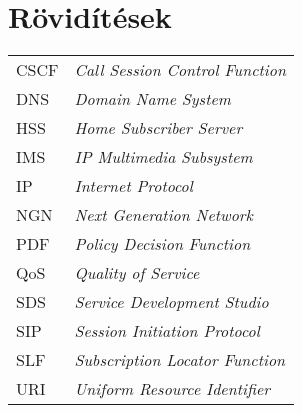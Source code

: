 

\section*{Rövidítések}
\label{sec:roviditesek}

\begin{tabular}{p{2cm}l}
CSCF & \emph{Call Session Control Function} \\
DNS & \emph{Domain Name System} \\
HSS & \emph{Home Subscriber Server} \\
IMS & \emph{IP Multimedia Subsystem} \\
IP & \emph{Internet Protocol} \\
NGN & \emph{Next Generation Network} \\
PDF & \emph{Policy Decision Function} \\
QoS & \emph{Quality of Service} \\
SDS & \emph{Service Development Studio} \\
SIP & \emph{Session Initiation Protocol} \\
SLF & \emph{Subscription Locator Function} \\
URI & \emph{Uniform Resource Identifier} \\
\end{tabular}

